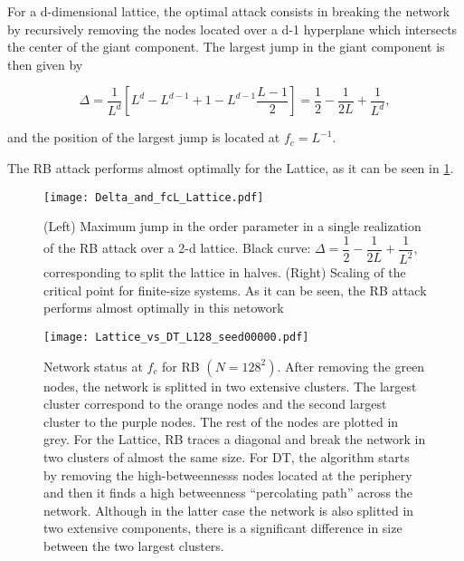 \documentclass{article}
\begin{document}
For a d-dimensional lattice, the optimal attack consists in breaking the network by recursively removing the nodes located over a d-1 hyperplane which intersects the center of the giant component. The largest jump in the giant component is then given by

\begin{equation}
\Delta = \dfrac{1}{L^d} \left[ L^d - L^{d-1} + 1 - L^{d-1} \dfrac{L-1}{2} \right] = \dfrac{1}{2} - \dfrac{1}{2L} + \dfrac{1}{L^d},
\end{equation}

and the position of the largest jump is located at $f_c = L^{-1}$.

The RB attack performs almost optimally for the Lattice, as it can be seen in \ref{fig:Delta_Lattice}.

\begin{figure}
\centering
\texttt{[image: Delta\_and\_fcL\_Lattice.pdf]}
\caption{\label{fig:Delta_Lattice} (Left) Maximum jump in the order parameter in a single realization of the RB attack over a 2-d lattice. Black curve: $\Delta = \dfrac{1}{2}-\dfrac{1}{2L} + \dfrac{1}{L^2}$, corresponding to split the lattice in halves. (Right) Scaling of the critical point for finite-size systems. As it can be seen, the RB attack performs almost optimally in this netowork}
\end{figure}

\begin{figure}
\centering
\texttt{[image: Lattice\_vs\_DT\_L128\_seed00000.pdf]}
\caption{Network status at $f_c$ for RB $(N = 128^2)$. After removing the green nodes, the network is splitted in two extensive clusters. The largest cluster correspond to the orange nodes and the second largest cluster to the purple nodes. The rest of the nodes are plotted in grey. For the Lattice, RB traces a diagonal and break the network in two clusters of almost the same size. For DT, the algorithm starts by removing the high-betweennesss nodes located at the periphery and then it finds a high betweenness ``percolating path'' across  the network. Although in the latter case the network is also splitted in two extensive components, there is a significant difference in size between the two largest clusters. }
\end{figure}



\end{document}
